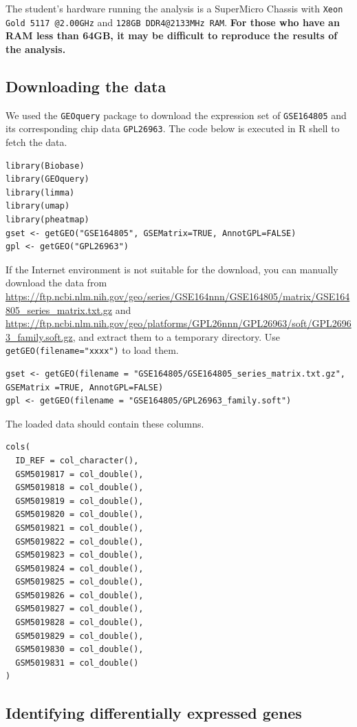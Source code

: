 \documentclass[en,black,12pt,normal]{elegantnote}
\begin{document}
The student's hardware running the analysis is a SuperMicro Chassis with \lstinline{Xeon Gold 5117 @2.00GHz} and \lstinline{128GB DDR4@2133MHz RAM}. \textbf{For those who have an RAM less than 64GB, it may be difficult to reproduce the results of the analysis.}

\subsection{Downloading the data}

We used the \lstinline{GEOquery} package to download the expression set of \lstinline{GSE164805} and its corresponding chip data \lstinline{GPL26963}. The code below is executed in R shell to fetch the data.

\begin{lstlisting}
library(Biobase)
library(GEOquery)
library(limma)
library(umap)
library(pheatmap)
gset <- getGEO("GSE164805", GSEMatrix=TRUE, AnnotGPL=FALSE)
gpl <- getGEO("GPL26963")
\end{lstlisting}

If the Internet environment is not suitable for the download, you can manually download the data from \url{https://ftp.ncbi.nlm.nih.gov/geo/series/GSE164nnn/GSE164805/matrix/GSE164805_series_matrix.txt.gz} and \url{https://ftp.ncbi.nlm.nih.gov/geo/platforms/GPL26nnn/GPL26963/soft/GPL26963_family.soft.gz}, and extract them to a temporary directory. Use \lstinline{getGEO(filename="xxxx")} to load them.

\begin{lstlisting}
gset <- getGEO(filename = "GSE164805/GSE164805_series_matrix.txt.gz", GSEMatrix =TRUE, AnnotGPL=FALSE)
gpl <- getGEO(filename = "GSE164805/GPL26963_family.soft")
\end{lstlisting}

The loaded data should contain these columns.
\begin{lstlisting}
cols(
  ID_REF = col_character(),
  GSM5019817 = col_double(),
  GSM5019818 = col_double(),
  GSM5019819 = col_double(),
  GSM5019820 = col_double(),
  GSM5019821 = col_double(),
  GSM5019822 = col_double(),
  GSM5019823 = col_double(),
  GSM5019824 = col_double(),
  GSM5019825 = col_double(),
  GSM5019826 = col_double(),
  GSM5019827 = col_double(),
  GSM5019828 = col_double(),
  GSM5019829 = col_double(),
  GSM5019830 = col_double(),
  GSM5019831 = col_double()
)
\end{lstlisting}

\subsection{Identifying differentially expressed genes}
\end{document}
